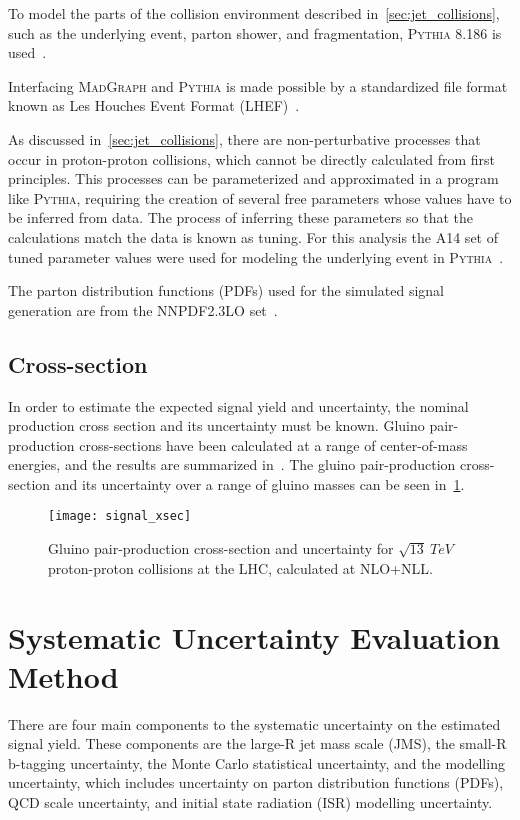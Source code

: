 To model the parts of the collision environment described in~\ref{sec:jet_collisions}, such as the underlying event,
parton shower, and fragmentation, \textsc{Pythia} 8.186 is used~\cite{signal-pythia}.

Interfacing \textsc{MadGraph} and \textsc{Pythia} is made possible by a standardized file format known as Les Houches
Event Format (LHEF)~\cite{signal-lhef}.

As discussed in~\ref{sec:jet_collisions}, there are non-perturbative processes that occur in proton-proton collisions,
which cannot be directly calculated from first principles.
This processes can be parameterized and approximated in a program like \textsc{Pythia},
requiring the creation of several free parameters whose values have to be inferred from data.
The process of inferring these parameters so that the calculations match the data is known as tuning.
For this analysis the A14 set of tuned parameter values were used for modeling the underlying event in
\textsc{Pythia}~\cite{signal-pythia-a14,signal-pythia-tunes}.

The parton distribution functions (PDFs) used for the simulated signal generation are from the NNPDF2.3LO
set~\cite{signal-nnpdf}.

\subsection{Cross-section}\label{subsec:signal_cross_section}
In order to estimate the expected signal yield and uncertainty, the nominal production cross section and its uncertainty
must be known.
Gluino pair-production cross-sections have been calculated at a range of center-of-mass energies, and the results
are summarized in~\cite{signal-xsec}.
The gluino pair-production cross-section and its uncertainty over a range of gluino masses can be seen in~\ref{fig:signal_xsec}.

\begin{figure}[!ht]
    \centering
\texttt{[image: signal\_xsec]}
\caption{Gluino pair-production cross-section and uncertainty for $\sqrt{13}~TeV$ proton-proton collisions at the LHC,
calculated at NLO+NLL.
}
\label{fig:signal_xsec}
\end{figure}

\section{Systematic Uncertainty Evaluation Method}\label{sec:signal_systematics_method}
There are four main components to the systematic uncertainty on the
estimated signal yield.
These components are the large-R jet mass scale (JMS), the small-R b-tagging uncertainty, the Monte Carlo statistical
uncertainty, and the modelling uncertainty, which includes uncertainty
on parton distribution functions (PDFs), QCD scale uncertainty, and
initial state radiation (ISR) modelling uncertainty.

